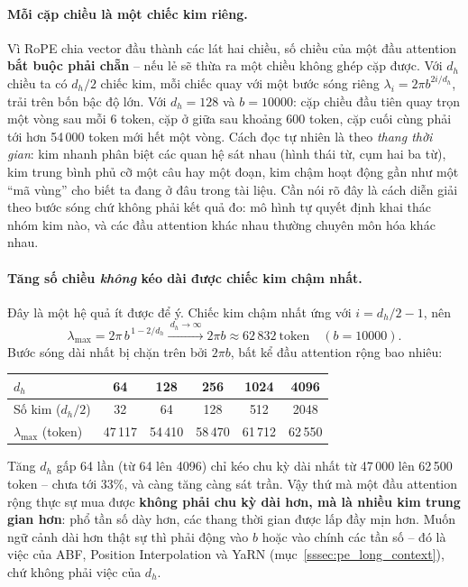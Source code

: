 \paragraph{Mỗi cặp chiều là một chiếc kim riêng.} Vì RoPE chia vector đầu thành các lát hai chiều, số chiều của một đầu attention \textbf{bắt buộc phải chẵn} -- nếu lẻ sẽ thừa ra một chiều không ghép cặp được. Với $d_h$ chiều ta có $d_h/2$ chiếc kim, mỗi chiếc quay với một bước sóng riêng $\lambda_i = 2\pi b^{2i/d_h}$, trải trên bốn bậc độ lớn. Với $d_h = 128$ và $b = 10000$: cặp chiều đầu tiên quay trọn một vòng sau mỗi 6 token, cặp ở giữa sau khoảng 600 token, cặp cuối cùng phải tới hơn 54\,000 token mới hết một vòng. Cách đọc tự nhiên là theo \emph{thang thời gian}: kim nhanh phân biệt các quan hệ sát nhau (hình thái từ, cụm hai ba từ), kim trung bình phủ cỡ một câu hay một đoạn, kim chậm hoạt động gần như một “mã vùng” cho biết ta đang ở đâu trong tài liệu. Cần nói rõ đây là cách diễn giải theo bước sóng chứ không phải kết quả đo: mô hình tự quyết định khai thác nhóm kim nào, và các đầu attention khác nhau thường chuyên môn hóa khác nhau.

\paragraph{Tăng số chiều \emph{không} kéo dài được chiếc kim chậm nhất.} Đây là một hệ quả ít được để ý. Chiếc kim chậm nhất ứng với $i = d_h/2 - 1$, nên
\[
\lambda_{\max} = 2\pi\, b^{\,1 - 2/d_h} \xrightarrow{\ d_h \to \infty\ } 2\pi b \approx 62\,832 \ \text{token} \quad (b = 10000).
\]
Bước sóng dài nhất bị chặn trên bởi $2\pi b$, bất kể đầu attention rộng bao nhiêu:

\begin{center}
\small
\begin{tabular}{@{}lccccc@{}}
\toprule
$d_h$ & 64 & 128 & 256 & 1024 & 4096 \\
\midrule
Số kim ($d_h/2$) & 32 & 64 & 128 & 512 & 2048 \\
$\lambda_{\max}$ (token) & 47\,117 & 54\,410 & 58\,470 & 61\,712 & 62\,550 \\
\bottomrule
\end{tabular}
\end{center}

\noindent Tăng $d_h$ gấp 64 lần (từ 64 lên 4096) chỉ kéo chu kỳ dài nhất từ 47\,000 lên 62\,500 token -- chưa tới 33\%, và càng tăng càng sát trần. Vậy thứ mà một đầu attention rộng thực sự mua được \textbf{không phải chu kỳ dài hơn, mà là nhiều kim trung gian hơn}: phổ tần số dày hơn, các thang thời gian được lấp đầy mịn hơn. Muốn ngữ cảnh dài hơn thật sự thì phải động vào $b$ hoặc vào chính các tần số -- đó là việc của ABF, Position Interpolation và YaRN (mục~\ref{sssec:pe_long_context}), chứ không phải việc của $d_h$.

